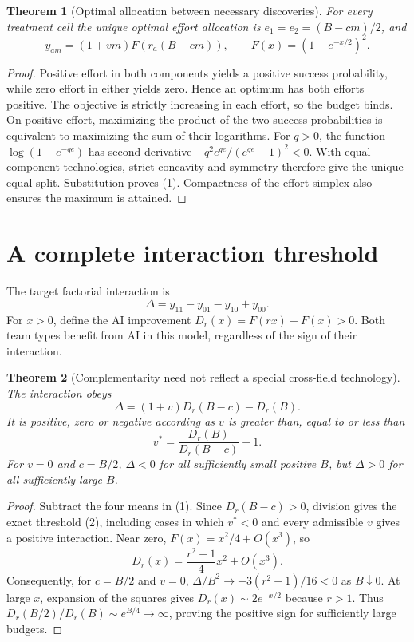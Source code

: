\documentclass[11pt,a4paper]{article}
\newtheorem{theorem}{Theorem}[section]
\theoremstyle{definition}
\theoremstyle{remark}
\begin{document}
\begin{theorem}[Optimal allocation between necessary discoveries]
For every treatment cell the unique optimal effort allocation is
$e_1=e_2=(B-cm)/2$, and
\[
 y_{am}=(1+vm)F(r_a(B-cm)),\qquad F(x)=(1-e^{-x/2})^2.\tag{1}
\]
\end{theorem}
\begin{proof}
Positive effort in both components yields a positive success probability, while zero effort in either yields zero. Hence an optimum has both efforts positive. The objective is strictly increasing in each effort, so the budget binds. On positive effort, maximizing the product of the two success probabilities is equivalent to maximizing the sum of their logarithms. For $q>0$, the function $\log(1-e^{-q e})$ has second derivative $-q^2e^{qe}/(e^{qe}-1)^2<0$. With equal component technologies, strict concavity and symmetry therefore give the unique equal split. Substitution proves (1). Compactness of the effort simplex also ensures the maximum is attained.
\end{proof}

\section{A complete interaction threshold}
The target factorial interaction is
\[
 \Delta=y_{11}-y_{01}-y_{10}+y_{00}.
\]
For $x>0$, define the AI improvement $D_r(x)=F(rx)-F(x)>0$. Both team types benefit from AI in this model, regardless of the sign of their interaction.

\begin{theorem}[Complementarity need not reflect a special cross-field technology]
The interaction obeys
\[
 \Delta=(1+v)D_r(B-c)-D_r(B).
\]
It is positive, zero or negative according as $v$ is greater than, equal to or less than
\[
 v^*=\frac{D_r(B)}{D_r(B-c)}-1.\tag{2}
\]
For $v=0$ and $c=B/2$, $\Delta<0$ for all sufficiently small positive $B$, but $\Delta>0$ for all sufficiently large $B$.
\end{theorem}
\begin{proof}
Subtract the four means in (1). Since $D_r(B-c)>0$, division gives the exact threshold (2), including cases in which $v^*<0$ and every admissible $v$ gives a positive interaction. Near zero,
$F(x)=x^2/4+O(x^3)$, so
\[
 D_r(x)=\frac{r^2-1}{4}x^2+O(x^3).
\]
Consequently, for $c=B/2$ and $v=0$, $\Delta/B^2\to-3(r^2-1)/16<0$ as $B\downarrow0$. At large $x$, expansion of the squares gives
$D_r(x)\sim2e^{-x/2}$ because $r>1$. Thus $D_r(B/2)/D_r(B)\sim e^{B/4}\to\infty$, proving the positive sign for sufficiently large budgets.
\end{proof}
\end{document}
